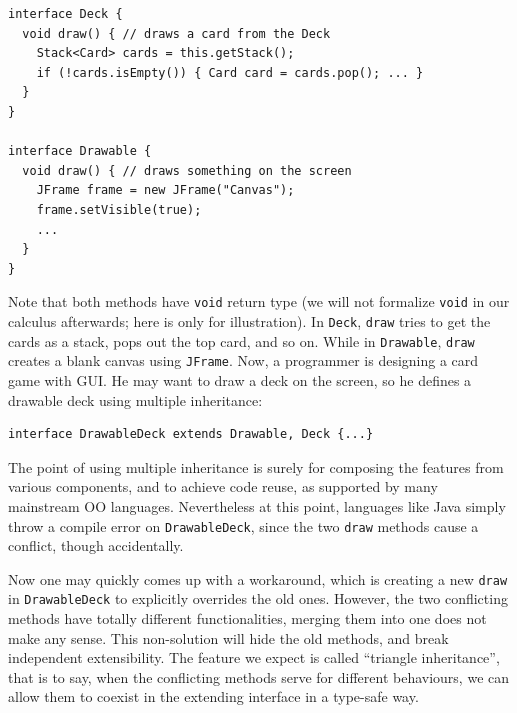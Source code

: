 \vspace{3pt}\begin{lstlisting}
interface Deck {
  void draw() { // draws a card from the Deck
    Stack<Card> cards = this.getStack();
    if (!cards.isEmpty()) { Card card = cards.pop(); ... }
  }
}

interface Drawable {
  void draw() { // draws something on the screen
    JFrame frame = new JFrame("Canvas");
    frame.setVisible(true);
    ...
  }
}
\end{lstlisting}\vspace{3pt}
Note that both methods have \lstinline|void| return type (we will not formalize
\lstinline|void| in our calculus afterwards; here is only for illustration). In \lstinline|Deck|, \lstinline|draw| tries to get the cards as a stack, pops
out the top card, and so on. While in \lstinline|Drawable|, \lstinline|draw|
creates a blank canvas using \lstinline|JFrame|. Now, a programmer is designing a
card game with GUI. He may want to draw a deck on the screen, so he defines a drawable
deck using multiple inheritance:

\vspace{3pt}\begin{lstlisting}
interface DrawableDeck extends Drawable, Deck {...} 
\end{lstlisting}\vspace{3pt}
The point of using multiple inheritance is surely for composing the features from various 
components, and to achieve code reuse, as supported by many mainstream OO
languages. Nevertheless at this point, languages like Java simply throw a compile
error on \lstinline|DrawableDeck|, since the two \lstinline|draw| methods cause a conflict, though accidentally.

Now one may quickly comes up with a workaround, which is creating a new \lstinline|draw| in \lstinline|DrawableDeck| to
explicitly overrides the old ones. However, the two conflicting methods have totally different functionalities, merging
them into one does not make any sense. This non-solution will hide the old methods, and break independent extensibility. The
feature we expect is called ``triangle inheritance'', that is to say, when the conflicting methods serve for different behaviours,
we can allow them to coexist in the extending interface in a type-safe way.\\

